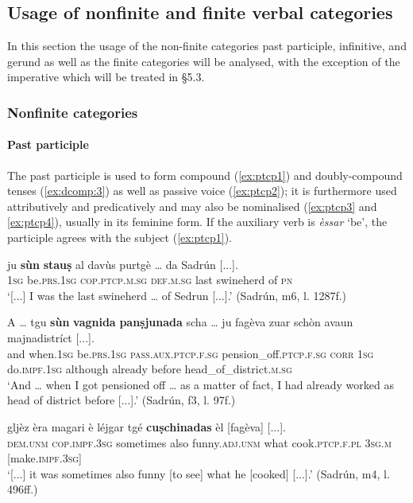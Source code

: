 \subsection{Usage of nonfinite and finite verbal categories}
In this section the usage of the non-finite categories past participle, infinitive, and gerund as well as the finite categories will be analysed, with the exception of the imperative which will be treated in §5.3.

\subsubsection{Nonfinite categories}

\paragraph{Past participle}
The past participle is used to form compound (\ref{ex:ptcp1}) and doubly-compound tenses (\ref{ex:dcomp:3}) as well as passive voice (\ref{ex:ptcp2}); it is furthermore used attributively and predicatively and may also be nominalised (\ref{ex:ptcp3} and \ref{ex:ptcp4}), usually in its feminine form. If the auxiliary verb is \textit{èssar} `be', the participle agrees with the subject (\ref{ex:ptcp1}).

\ea
\label{ex:ptcp1}
\gll    [...] ju \textbf{sùn} \textbf{stauṣ} al davùs purtgè … da Sadrún [...].\\
{}  \textsc{1sg} be.\textsc{prs.1sg} \textsc{cop.ptcp.m.sg} \textsc{def.m.sg} last swineherd {} of \textsc{pn} \\
\glt `[...] I was the last swineherd … of Sedrun [...].' (Sadrún, m6, l. 1287f.)
\z

\ea\label{ex:ptcp2}
\gll  A … tgu \textbf{sùn} \textbf{vagnida} \textbf{panṣjunada} scha … ju fagèva zuar schòn avaun majnadistríct [...].\\
and {} when.\textsc{1sg} be.\textsc{prs.1sg} \textsc{pass.aux.ptcp.f.sg} pension\_off.\textsc{ptcp.f.sg} \textsc{corr} {} \textsc{1sg} do.\textsc{impf.1sg} although already before head\_of\_district.\textsc{m.sg}\\
\glt `And … when I got pensioned off … as a matter of fact, I had already worked as head of district before [...].' (Sadrún, f3, l. 97f.)
\z

\ea\label{ex:ptcp3}
\gll [...] gljèz èra magari è léjgar  tgé \textbf{cuṣchinadas} èl [fagèva] [...].\\
{} \textsc{dem.unm} \textsc{cop.impf.3sg} sometimes also funny.\textsc{adj.unm} what cook.\textsc{ptcp.f.pl}  \textsc{3sg.m} [make.\textsc{impf.3sg}] \\
\glt `[...] it was sometimes also funny [to see] what he [cooked] [...].' (Sadrún, m4, l. 496ff.)
\z

